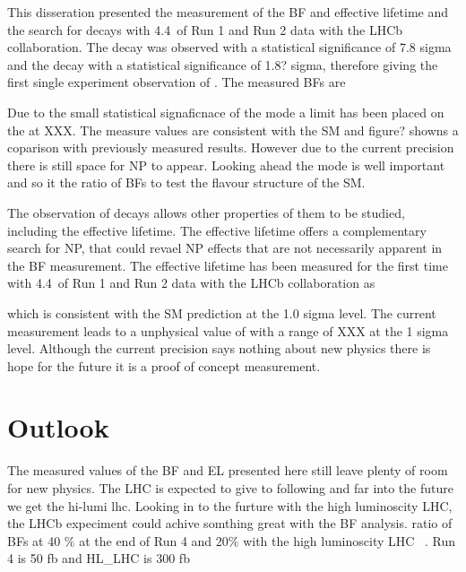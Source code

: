 This disseration presented the measurement of the \bsmumu BF and effective lifetime and the search for \bdmumu decays with 4.4~\fb of Run 1 and Run 2 data with the LHCb collaboration. The \bsmumu decay was observed with a statistical significance of 7.8 sigma and the \bdmumu decay with a statistical significance of 1.8? sigma, therefore giving the first single experiment observation of \bsmumu. 
The measured BFs are


Due to the small statistical signaficnace of the \bd mode a limit has been placed on the \BF at XXX. The measure values are consistent with the SM and figure? showns a coparison with previously measured results. However due to the current precision there is still space for NP to appear. Looking ahead the \bd mode is well important and so it the ratio of BFs to test the flavour structure of the SM.

The observation of \bsmumu decays allows other properties of them to be studied, including the \bsmumu effective lifetime. The effective lifetime offers a complementary search for NP, that could revael NP effects that are not necessarily apparent in the BF measurement. The effective lifetime has been measured for the first time with 4.4~\fb of Run 1 and Run 2 data with the LHCb collaboration as

which is consistent with the SM prediction at the 1.0 sigma level. The current measurement leads to a unphysical value of \ADG with a range of XXX at the 1 sigma level. Although the current precision says nothing about new physics there is hope for the future it is a proof of concept measurement.

\section{Outlook}

The measured values of the BF and EL presented here still leave plenty of room for new physics. The LHC is expected to give to following and far into the future we get the hi-lumi lhc.
 Looking in to the furture with the high luminoscity LHC, the LHCb expeciment could achive somthing great with the BF analysis.
ratio of BFs at 40 $\%$ at the end of Run 4 and 20$\%$ with the high luminoscity LHC ~\cite{Aaij:2244311}. Run 4 is 50 fb and HL_LHC is 300 fb

